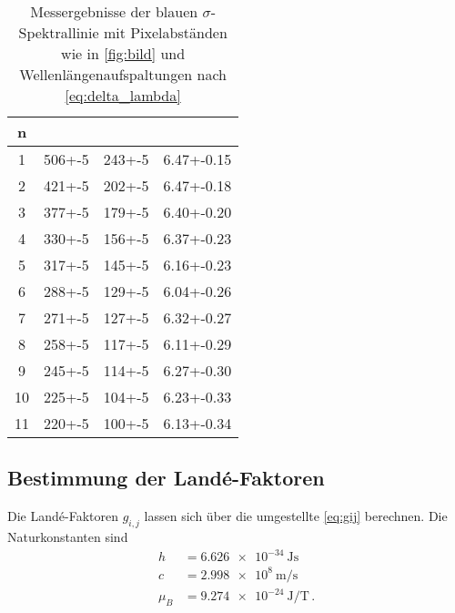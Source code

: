\begin{table}[ht]
    \centering
    \caption{Messergebnisse der blauen $\sigma$-Spektrallinie mit Pixelabständen wie in \autoref{fig:bild} und Wellenlängenaufspaltungen nach \autoref{eq:delta_lambda}}
    \label{tab:blau_sigma}
    \begin{tabular}{S[table-format=1.0] S[table-format=3.0(1)] S[table-format=3.0(1)] S[table-format=1.2(3)]}
        \toprule
        n &  & & \tableSI{\delta \lambda}{\pico\meter}  \\
         & 506+-5 & 243+-5 & 6.47+-0.15 \\
        2 & 421+-5 & 202+-5 & 6.47+-0.18 \\
        3 & 377+-5 & 179+-5 & 6.40+-0.20 \\
        4 & 330+-5 & 156+-5 & 6.37+-0.23 \\
        5 & 317+-5 & 145+-5 & 6.16+-0.23 \\
        6 & 288+-5 & 129+-5 & 6.04+-0.26 \\
        7 & 271+-5 & 127+-5 & 6.32+-0.27 \\
        8 & 258+-5 & 117+-5 & 6.11+-0.29 \\
        9 & 245+-5 & 114+-5 & 6.27+-0.30 \\
        10 & 225+-5 & 104+-5 & 6.23+-0.33 \\
        11 & 220+-5 & 100+-5 & 6.13+-0.34 \\
        \bottomrule
    \end{tabular}
\end{table}

\subsection{Bestimmung der Landé-Faktoren}
\label{ssec:Bestimmung der Lande-Faktoren}

Die Landé-Faktoren $g_{i,j}$ lassen sich über die umgestellte \autoref{eq:gij} berechnen.
Die Naturkonstanten sind 
\begin{align*}
    h &= \SI{6.626e-34}{\joule\second} \\
    c &= \SI{2.998e8}{\meter\per\second} \\
    \mu_B &= \SI{9.274e-24}{\joule\per\tesla} \, .
\end{align*}

